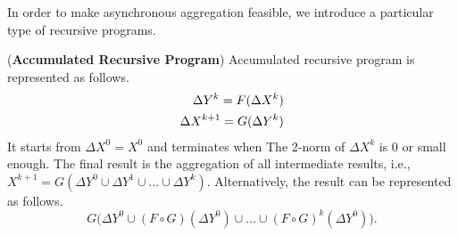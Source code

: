 In order to make asynchronous aggregation feasible, we introduce a particular type of recursive programs.

\begin{definition}
	\label{def:accumasync}
	(\textbf{Accumulated Recursive Program}) Accumulated recursive program is represented as follows.
	\begin{equation}\label{eq:accumasync}
	\begin{aligned}
	\Delta Y^{k}= F(\Delta X^k)\notag\\
	\Delta X^{k+1}= G(\Delta Y^{k})\notag
	\end{aligned}
	\end{equation}
	It starts from $\Delta X^0=X^0$ and terminates when The 2-norm of $\Delta X^k$ is 0 or small enough. The final result is the aggregation of all intermediate results, i.e., $X^{k+1}=G(\Delta Y^{0} \cup \Delta Y^{1} \cup \ldots \cup \Delta Y^{k})$. Alternatively, the result can be represented as follows.
	\begin{equation}
	\label{eq:accumasyncres}
	G\Big(\Delta Y^0\cup (F\circ G)(\Delta Y^0)\cup\ldots\cup (F\circ G)^k(\Delta Y^0)\Big).
	\end{equation}
\end{definition}


